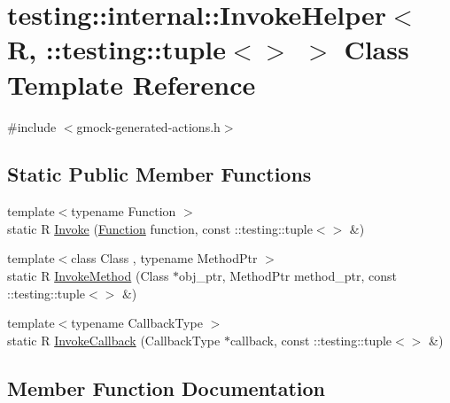 \hypertarget{classtesting_1_1internal_1_1_invoke_helper_3_01_r_00_01_1_1testing_1_1tuple_3_4_01_4}{}\section{testing\+::internal\+::Invoke\+Helper$<$ R, \+::testing\+::tuple$<$$>$ $>$ Class Template Reference}
\label{classtesting_1_1internal_1_1_invoke_helper_3_01_r_00_01_1_1testing_1_1tuple_3_4_01_4}


{\ttfamily \#include $<$gmock-\/generated-\/actions.\+h$>$}

\subsection*{Static Public Member Functions}
\begin{DoxyCompactItemize}
\item 
{\footnotesize template$<$typename Function $>$ }\\static R \mbox{\hyperlink{classtesting_1_1internal_1_1_invoke_helper_3_01_r_00_01_1_1testing_1_1tuple_3_4_01_4_a55e6218235e69a896d88a3076a2c6150}{Invoke}} (\mbox{\hyperlink{structtesting_1_1internal_1_1_function}{Function}} function, const \+::testing\+::tuple$<$$>$ \&)
\item 
{\footnotesize template$<$class Class , typename Method\+Ptr $>$ }\\static R \mbox{\hyperlink{classtesting_1_1internal_1_1_invoke_helper_3_01_r_00_01_1_1testing_1_1tuple_3_4_01_4_a0368e26cbc1bcb12abbfb802f8294fa0}{Invoke\+Method}} (Class $\ast$obj\+\_\+ptr, Method\+Ptr method\+\_\+ptr, const \+::testing\+::tuple$<$$>$ \&)
\item 
{\footnotesize template$<$typename Callback\+Type $>$ }\\static R \mbox{\hyperlink{classtesting_1_1internal_1_1_invoke_helper_3_01_r_00_01_1_1testing_1_1tuple_3_4_01_4_a9d81d455ebad0e8bf02a7d04c07ccb20}{Invoke\+Callback}} (Callback\+Type $\ast$callback, const \+::testing\+::tuple$<$$>$ \&)
\end{DoxyCompactItemize}


\subsection{Member Function Documentation}
\mbox{\label{classtesting_1_1internal_1_1_invoke_helper_3_01_r_00_01_1_1testing_1_1tuple_3_4_01_4_a55e6218235e69a896d88a3076a2c6150}} 
